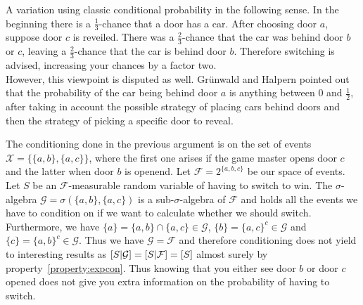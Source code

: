 \documentclass[twoside,a4paper]{article}
\theoremstyle{plain}
\theoremstyle{definition}
\theoremstyle{remark}
\numberwithin{equation}{section}
\let\P\relax
\DeclareMathOperator{\P}{\mathbb{P}}
\DeclareMathOperator{\1}{\mathbbm{1}}
\newcommand{\F}{\mathcal{F}}
\renewcommand{\G}{\mathcal{G}}
\newcommand{\X}{\mathcal{X}}
\begin{document}
A variation using classic conditional probability in the following sense. In the beginning there is a $\frac{1}{3}$-chance that a door has a car. After choosing door $a$, suppose door $c$ is reveiled. There was a $\frac{2}{3}$-chance that the car was behind door $b$ or $c$, leaving a $\frac{2}{3}$-chance that the car is behind door $b$. Therefore switching is advised, increasing your chances by a factor two.\\
However, this viewpoint is disputed as well. Grünwald and Halpern \cite{Grunwald03} pointed out that the probability of the car being behind door $a$ is anything between $0$ and $\frac{1}{2}$, after taking in account the possible strategy of placing cars behind doors and then the strategy of picking a specific door to reveal.

The conditioning done in the previous argument is on the set of events $\X=\{\{a,b\},\{a,c\}\}$, where the first one arises if the game master opens door $c$ and the latter when door $b$ is openend. Let $\F=2^{\{a,b,c\}}$ be our space of events. Let $S$ be an $\F$-measurable random variable of having to switch to win. The $\sigma$-algebra $\G=\sigma(\{a,b\},\{a,c\})$ is a sub-$\sigma$-algebra of $\F$ and holds all the events we have to condition on if we want to calculate whether we should switch. Furthermore, we have $\{a\}=\{a,b\}\cap\{a,c\}\in\G$, $\{b\}=\{a,c\}^c\in\G$ and $\{c\}=\{a,b\}^c\in\G$. Thus we have $\G=\F$ and therefore conditioning does not yield to interesting results as $\P[S|\G]= \P[S|\F]=\P[S]$ almost surely by property~\ref{property:expcon}. Thus knowing that you either see door $b$ or door $c$ opened does not give you extra information on the probability of having to switch.
\end{document}

